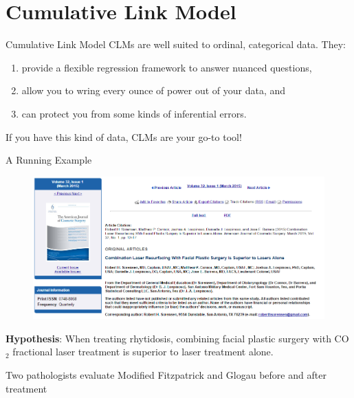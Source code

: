 \documentclass{beamer}
\begin{document}
\section{Cumulative Link Model}
\begin{frame}{Cumulative Link Model}
CLMs are well suited to ordinal, categorical data. They:

\begin{enumerate}
\item provide a flexible regression framework to answer nuanced questions,
\item allow you to wring every ounce of power out of your data, and
\item can protect you from some kinds of inferential errors.
\end{enumerate}

If you have this kind of data, CLMs are your go-to tool!
\end{frame}

\begin{frame}{A Running Example}
\begin{figure}
\centering
\includegraphics[width=1.1\textwidth]{Sorensen2015}
\label{fig:sorensen_2015}
\end{figure}
\end{frame}

\begin{frame}
\textbf{Hypothesis}: When treating rhytidosis, combining facial plastic surgery with CO$_2$ fractional laser treatment is superior to laser treatment alone.

\vspace{25pt}

Two pathologists evaluate Modified Fitzpatrick and Glogau before and after treatment
\end{frame}
\end{document}

